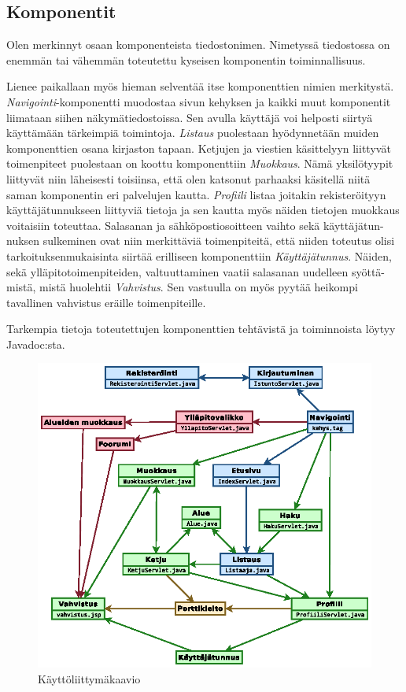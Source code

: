 \documentclass[11pt]{article}
\begin{document}
		\subsection{Komponentit}
			Olen merkinnyt osaan komponenteista tiedostonimen. Nimetyssä tiedostossa on enemmän tai vähemmän
			toteutettu kyseisen komponentin toiminnallisuus.
		
			Lienee paikallaan myös hieman selventää itse komponenttien nimien merkitystä. 
			\emph{Navigointi}-komponentti muodostaa sivun kehyksen ja kaikki muut komponentit liimataan siihen
			näkymätiedostoissa. Sen avulla käyttäjä voi helposti siirtyä käyttämään tärkeimpiä toimintoja.
			\emph{Listaus} puolestaan hyödynnetään muiden komponenttien osana kirjaston tapaan. Ketjujen ja
			viestien käsittelyyn liittyvät toimenpiteet puolestaan on koottu komponenttiin \emph{Muokkaus}.
			Nämä yksilötyypit liittyvät niin läheisesti toisiinsa, että olen katsonut parhaaksi käsitellä niitä
			saman komponentin eri palvelujen kautta. \emph{Profiili} listaa joitakin rekisteröityyn
			käyttäjätunnukseen liittyviä tietoja ja sen kautta myös näiden tietojen muokkaus voitaisiin
			toteuttaa. Salasanan ja sähköpostiosoitteen vaihto sekä käyttäjätun-nuksen sulkeminen ovat niin
			merkittäviä toimenpiteitä, että niiden toteutus olisi tarkoituksenmukaisinta siirtää erilliseen
			komponenttiin \emph{Käyttäjätunnus}. Näiden, sekä ylläpitotoimenpiteiden, valtuuttaminen vaatii
			salasanan uudelleen syöttä-mistä, mistä huolehtii \emph{Vahvistus}. Sen vastuulla on myös pyytää
			heikompi tavallinen vahvistus eräille toimenpiteille.
		
			Tarkempia tietoja toteutettujen komponenttien tehtävistä ja toiminnoista löytyy Javadoc:sta.
		
		\newpage
		\thispagestyle{plain}
		\begin{figure}[H]		
			\includegraphics[trim = 12mm 0mm 0mm 0mm, scale = 1.5]{kayttoliittymakaavio.eps}
			\caption{Käyttöliittymäkaavio}
		\end{figure}
		
\end{document}
